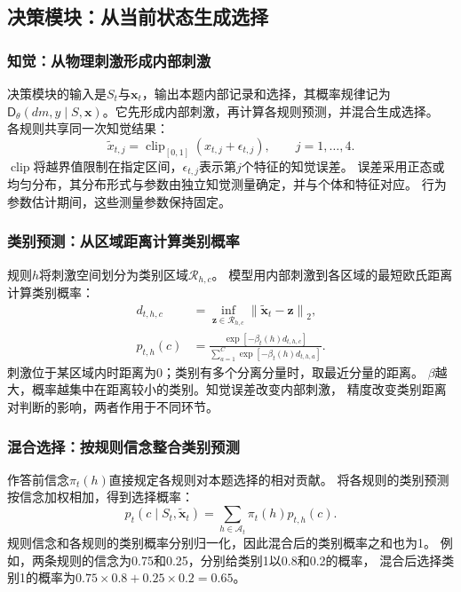 \documentclass[11pt,a4paper]{article}
\numberwithin{equation}{section}
\newcommand{\norm}[1]{\left\lVert#1\right\rVert}
\newcommand{\clip}{\operatorname{clip}}
\newcommand{\A}{\mathcal{A}}
\newcommand{\Dd}{\mathsf{D}}
\begin{document}
\subsection{决策模块：从当前状态生成选择}
\label{sec:decision}

\subsubsection{知觉：从物理刺激形成内部刺激}
决策模块的输入是$S_t$与$\bm x_t$，输出本题内部记录和选择，其概率规律记为
$\Dd_\theta(dm,y\mid S,\bm x)$。它先形成内部刺激，再计算各规则预测，并混合生成选择。
各规则共享同一次知觉结果：
\begin{equation}
\widetilde x_{t,j}=\clip_{[0,1]}(x_{t,j}+\epsilon_{t,j}),\qquad j=1,\ldots,4.
\label{eq:perception}
\end{equation}
$\clip$将越界值限制在指定区间，$\epsilon_{t,j}$表示第$j$个特征的知觉误差。
误差采用正态或均匀分布，其分布形式与参数由独立知觉测量确定，并与个体和特征对应。
行为参数估计期间，这些测量参数保持固定。

\subsubsection{类别预测：从区域距离计算类别概率}
规则$h$将刺激空间划分为类别区域$\mathcal R_{h,c}$。
模型用内部刺激到各区域的最短欧氏距离计算类别概率：
\begin{align}
d_{t,h,c}&=\inf_{\bm z\in\mathcal R_{h,c}}\norm{\widetilde{\bm x}_t-\bm z}_2,\\
p_{t,h}(c)&=\frac{\exp[-\beta_t(h)d_{t,h,c}]}
{\sum_{a=1}^C\exp[-\beta_t(h)d_{t,h,a}]}.
\label{eq:category}
\end{align}
刺激位于某区域内时距离为0；类别有多个分离分量时，取最近分量的距离。
$\beta$越大，概率越集中在距离较小的类别。知觉误差改变内部刺激，
精度改变类别距离对判断的影响，两者作用于不同环节。


\subsubsection{混合选择：按规则信念整合类别预测}
作答前信念$\pi_t(h)$直接规定各规则对本题选择的相对贡献。
将各规则的类别预测按信念加权相加，得到选择概率：
\begin{equation}
p_t(c\mid S_t,\widetilde{\bm x}_t)=\sum_{h\in\A_t}\pi_t(h)p_{t,h}(c).
\label{eq:choice}
\end{equation}
规则信念和各规则的类别概率分别归一化，因此混合后的类别概率之和也为1。
例如，两条规则的信念为0.75和0.25，分别给类别1以0.8和0.2的概率，
混合后选择类别1的概率为$0.75\times0.8+0.25\times0.2=0.65$。
\end{document}
